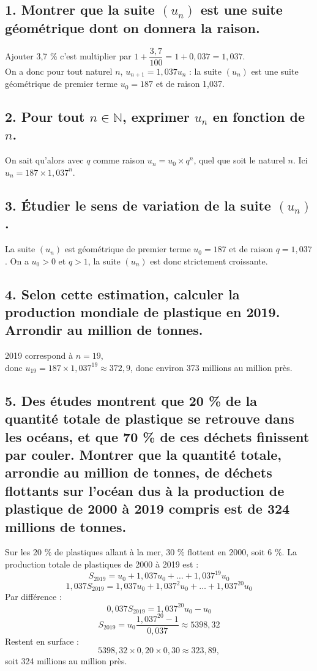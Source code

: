 \subsection*{1. Montrer que la suite \((u_n)\) est une suite géométrique dont on donnera la raison.}
Ajouter 3,7 \% c'est multiplier par \(1 + \dfrac{3,7}{100} = 1 + 0,037 = 1,037\).\\
 On a donc pour tout naturel \(n\), \(u_{n+1} = 1,037u_n\) : la suite \((u_n)\) est une suite géométrique de premier terme \(u_0 = 187\) et de raison 1,037.
	
\subsection*{2. Pour tout \(n \in \mathbb{N}\), exprimer \(u_n\) en fonction de \(n\).}
On sait qu'alors avec \(q\) comme raison \(u_n = u_0 \times q^n\), quel que soit le naturel \(n\). Ici \(u_n = 187 \times 1,037^n\).
	
\subsection*{3. Étudier le sens de variation de la suite \((u_n)\).}
	
	
	
	La suite \((u_n)\) est géométrique de premier terme \(u_0=187\) et de raison \(q=1,037\).
	On a \(u_0 > 0\) et \(q>1\), la suite \((u_n)\) est donc strictement croissante.
	
	\subsection*{4. Selon cette estimation, calculer la production mondiale de plastique en 2019. Arrondir au million de tonnes.}
	
	2019 correspond à \(n = 19\), \\
	donc \(u_{19} = 187 \times 1,037^{19} \approx 372,9\), donc environ 373 millions au million près.
	
	\subsection*{5. Des études montrent que 20 \% de la quantité totale de plastique se retrouve dans les océans, et que 70 \% de ces déchets finissent par couler. Montrer que la quantité totale, arrondie au million de tonnes, de déchets flottants sur l'océan dus à la production de plastique de 2000 à 2019 compris est de 324 millions de tonnes.}
	
	Sur les 20 \% de plastiques allant à la mer, 30 \% flottent en 2000, soit 6 \%. La production totale de plastiques de 2000 à 2019 est :
	\[ S_{2019} = u_0 + 1,037u_0 + \ldots + 1,037^{19}u_0 \]
	\[ 1,037S_{2019} = 1,037u_0 + 1,037^2u_0 + \ldots + 1,037^{20}u_0 \]
	Par différence :
	\[ 0,037S_{2019} = 1,037^{20}u_0 - u_0 \]
	\[ S_{2019} = u_0 \dfrac{1,037^{20} - 1}{0,037} \approx 5398,32 \]
	Restent en surface :
	\[ 5398,32 \times 0,20 \times 0,30 \approx 323,89, \]
	soit 324 millions au million près.
